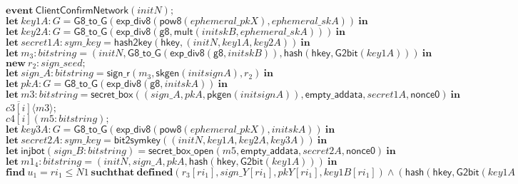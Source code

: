 \documentclass{article}
\newcommand{\cinput}[2]{{#1}({#2})}
\newcommand{\coutput}[2]{\overline{#1}\langle{#2}\rangle}
\newcommand{\kw}[1]{\mathbf{#1}}
\newcommand{\kwf}[1]{\mathsf{#1}}
\newcommand{\var}[1]{\mathit{#1}}
\newcommand{\kwt}[1]{\mathit{#1}}
\newcommand{\kwp}[1]{\mathit{#1}}
\newcommand{\kwc}[1]{\mathit{#1}}
\begin{document}
\begin{tabbing}
\>$\quad \kw{event}\ \kwf{ClientConfirmNetwork}(\var{initN});$\\
\>$\quad \kw{let}\ \var{key1A}: \kwt{G} = \kwf{G8{\_}to{\_}G}(\kwf{exp{\_}div8}(\kwf{pow8}(\var{ephemeral{\_}pkX}), \var{ephemeral{\_}skA}))\ \kw{in}$\\
\>$\quad \kw{let}\ \var{key2A}: \kwt{G} = \kwf{G8{\_}to{\_}G}(\kwf{exp{\_}div8}(\kwf{g8}, \kwf{mult}(\var{initskB}, \var{ephemeral{\_}skA})))\ \kw{in}$\\
\>$\quad \kw{let}\ \var{secret1A}: \kwt{sym{\_}key} = \kwf{hash2key}(\kwf{hkey}, \kwf{}(\var{initN}, \var{key1A}, \var{key2A}))\ \kw{in}$\\
\>$\quad \kw{let}\ \var{m}_{3}: \kwt{bitstring} = \kwf{}(\var{initN}, \kwf{G8{\_}to{\_}G}(\kwf{exp{\_}div8}(\kwf{g8}, \var{initskB})), \kwf{hash}(\kwf{hkey}, \kwf{G2bit}(\var{key1A})))\ \kw{in}$\\
\>$\quad \kw{new}\ \var{r}_{2}: \kwt{sign{\_}seed};$\\
\>$\quad \kw{let}\ \var{sign{\_}A}: \kwt{bitstring} = \kwf{sign{\_}r}(\var{m}_{3}, \kwf{skgen}(\var{initsignA}), \var{r}_{2})\ \kw{in}$\\
\>$\quad \kw{let}\ \var{pkA}: \kwt{G} = \kwf{G8{\_}to{\_}G}(\kwf{exp{\_}div8}(\kwf{g8}, \var{initskA}))\ \kw{in}$\\
\>$\quad \kw{let}\ \var{m3}: \kwt{bitstring} = \kwf{secret{\_}box}(\kwf{}(\var{sign{\_}A}, \var{pkA}, \kwf{pkgen}(\var{initsignA})), \kwf{empty{\_}addata}, \var{secret1A}, \kwf{nonce0})\ \kw{in}$\\
\>$\quad \coutput{\kwc{c3}[\var{i}]}{\var{m3}};$\\
\>$\quad \cinput{\kwc{c4}[\var{i}]}{\var{m5}: \kwt{bitstring}};$\\
\>$\quad \kw{let}\ \var{key3A}: \kwt{G} = \kwf{G8{\_}to{\_}G}(\kwf{exp{\_}div8}(\kwf{pow8}(\var{ephemeral{\_}pkX}), \var{initskA}))\ \kw{in}$\\
\>$\quad \kw{let}\ \var{secret2A}: \kwt{sym{\_}key} = \kwf{bit2symkey}(\kwf{}(\var{initN}, \var{key1A}, \var{key2A}, \var{key3A}))\ \kw{in}$\\
\>$\quad \kw{let}\ \kwf{injbot}(\var{sign{\_}B}: \kwt{bitstring}) = \kwf{secret{\_}box{\_}open}(\var{m5}, \kwf{empty{\_}addata}, \var{secret2A}, \kwf{nonce0})\ \kw{in}$\\
\>$\quad \kw{let}\ \var{m1}_{4}: \kwt{bitstring} = \kwf{}(\var{initN}, \var{sign{\_}A}, \var{pkA}, \kwf{hash}(\kwf{hkey}, \kwf{G2bit}(\var{key1A})))\ \kw{in}$\\
\>$\quad \kw{find}\ \var{u}_{1} = \var{ri}_{1} \leq \kwp{N1}\ \kw{suchthat}\ \kw{defined}(\var{r}_{3}[\var{ri}_{1}], \var{sign{\_}Y}[\var{ri}_{1}], \var{pkY}[\var{ri}_{1}], \var{key1B}[\var{ri}_{1}])\wedge (\kwf{hash}(\kwf{hkey}, \kwf{G2bit}(\var{key1A}))  =  \kwf{hash}(\kwf{hkey}, \kwf{G2bit}(\var{key1B}[\var{ri}_{1}]))) \wedge  (\var{pkA}  =  \var{pkY}[\var{ri}_{1}]) \wedge  (\var{sign{\_}A}  =  \var{sign{\_}Y}[\var{ri}_{1}]) \wedge  \kwf{check2}(\var{m1}_{4}, \kwf{pkgen2}(\var{initsignB}), \var{sign{\_}B})\ \kw{then}$\\

\end{tabbing}
\end{document}
